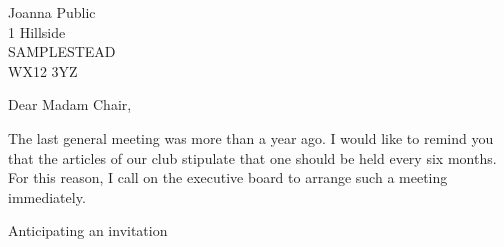 \documentclass{scrlttr2}
\begin{document}
\begin{letter}{%
    Joanna Public\\
    1 Hillside\\
    SAMPLESTEAD\\
    WX12 3YZ%
  }
\opening{Dear Madam Chair,}
The last general meeting was more than a year ago.
I would like to remind you that the articles of our
club stipulate that one should be held every
six months. For this reason, I call on the executive
board to arrange such a meeting immediately.
\closing{Anticipating an invitation}
\end{letter}
\end{document}
